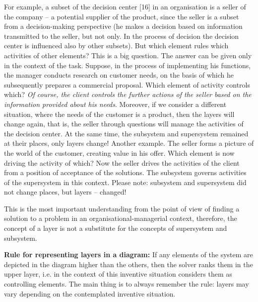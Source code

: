 \documentclass[11pt,a4paper]{book}
\begin{document}
For example, a subset of the decision center [16] in an organisation is a
seller of the company -- a potential supplier of the product, since the seller
is a subset from a decision-making perspective (he makes a decision based on
information transmitted to the seller, but not only. In the process of
decision the decision center is influenced also by other subsets). But which
element rules which activities of other elements? This is a big question. The
answer can be given only in the context of the task.  Suppose, in the process
of implementing his functions, the manager conducts research on customer
needs, on the basis of which he subsequently prepares a commercial proposal.
Which element of activity controls which? \emph{Of course, the client controls
  the further actions of the seller based on the information provided about
  his needs}. Moreover, if we consider a different situation, where the needs
of the customer is a product, then the layers will change again, that is, the
seller through questions will manage the activities of the decision center. At
the same time, the subsystem and supersystem remained at their places, only
layers change!  Another example. The seller forms a picture of the world of
the customer, creating value in his offer. Which element is now driving the
activity of which? Now the seller drives the activities of the client from a
position of acceptance of the solutions.  The subsystem governs activities of
the supersystem in this context.  Please note: subsystem and supersystem did
not change places, but layers -- changed!

This is the most important understanding from the point of view of finding a
solution to a problem in an organisational-managerial context, therefore, the
concept of a layer is not a substitute for the concepts of supersystem and
subsystem.

\textbf{Rule for representing layers in a diagram:} If any elements of the
system are depicted in the diagram higher than the others, then the solver
ranks them in the upper layer, i.e. in the context of this inventive situation
considers them as controlling elements. The main thing is to always remember
the rule: layers may vary depending on the contemplated inventive situation.
\end{document}

